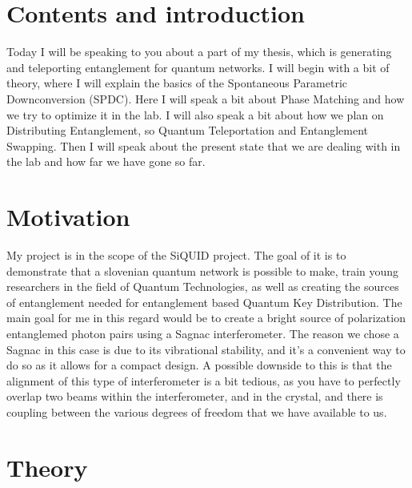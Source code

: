 \documentclass{article}
\theoremstyle{mytheoremstyle}
\theoremstyle{mytheoremstyle}
\theoremstyle{myproblemstyle}
\begin{document}

\section{Contents and introduction}
Today I will be speaking to you about a part of my thesis, which is generating and teleporting entanglement for quantum networks. I will begin with a bit of theory,
where I will explain the basics of the Spontaneous Parametric Downconversion (SPDC). Here I will speak a bit about Phase Matching and how we try to optimize it in the lab. I will also
speak a bit about how we plan on Distributing Entanglement, so Quantum Teleportation and Entanglement Swapping.
Then I will speak about the present state that we are dealing with in the lab and how far we have gone so far.

\section{Motivation}
My project is in the scope of the SiQUID project. The goal of it is to demonstrate that a slovenian quantum network is possible to make,
train young researchers in the field of Quantum Technologies, as well as creating the sources of entanglement needed for entanglement based Quantum Key Distribution.
The main goal for me in this regard would be to create a bright source of polarization entanglemed photon pairs using a Sagnac interferometer.
The reason we chose a Sagnac in this case is due to its vibrational stability, and it's a convenient way to do so as it allows for a compact design.
A possible downside to this is that the alignment of this type of interferometer is a bit tedious, as you have to perfectly overlap two beams within the interferometer,
and in the crystal, and there is coupling between the various degrees of freedom that we have available to us.

\section{Theory}
\end{document}
